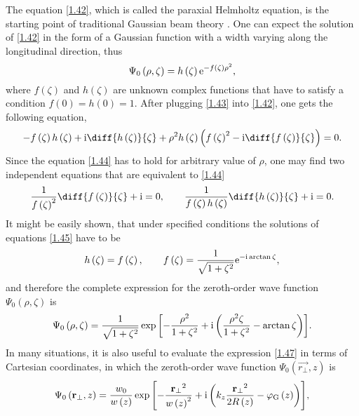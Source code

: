The equation \ref{1.42}, which is called the paraxial Helmholtz equation, is the starting point of traditional Gaussian beam theory \cite{Davis1979}. One can expect the solution of \ref{1.42} in the form of a Gaussian function with a width varying along the longitudinal direction, thus 
\begin{equation}
\label{1.43}
\Psi_0 \left(\rho, \zeta \right) = h\left(\zeta \right)\mathrm{e}^{-f\left(\zeta \right) \rho^2},
\end{equation}
where $ f\left(\zeta \right) $ and $ h\left(\zeta \right) $ are unknown complex functions that have to satisfy a condition $ f\left(0 \right) = h\left(0 \right) = 1 $. After plugging \ref{1.43} into \ref{1.42}, one gets the following equation,
\begin{equation}
\label{1.44}
-f\left(\zeta \right) h\left(\zeta \right) + \i \diff{h\left(\zeta \right)}{\zeta} + \rho^2 h\left(\zeta \right) \left(f\left(\zeta \right)^2 - \i \diff{f\left(\zeta \right)}{\zeta} \right) = 0.
\end{equation}
Since the equation \ref{1.44} has to hold for arbitrary value of $ \rho $, one may find two independent equations that are equivalent to \ref{1.44}
\begin{equation}
\label{1.45}
\frac{1}{f\left(\zeta \right)^2} \diff{f\left(\zeta \right)}{\zeta} + \i = 0, \qquad \frac{1}{f\left(\zeta \right) h\left(\zeta \right)} \diff{h\left(\zeta \right)}{\zeta} + \i = 0.
\end{equation}
It might be easily shown, that under specified conditions the solutions of equations \ref{1.45} have to be
\begin{equation}
\label{1.46}
h\left(\zeta \right) = f\left(\zeta \right), \qquad f\left(\zeta \right) = \frac{1}{\sqrt{1 + \zeta^2}} \mathrm{e}^{-\mathrm{i} \arctan{\zeta}},
\end{equation}
and therefore the complete expression for the zeroth-order wave function $ \Psi_0 \left(\rho, \zeta \right) $ is
\begin{equation}
\label{1.47}
\Psi_0 \left(\rho, \zeta \right) = \frac{1}{\sqrt{1 + \zeta^2}} \exp{\left[- \frac{\rho^2}{1 + \zeta^2} + \mathrm{i}\left(\frac{\rho^2 \zeta}{1 + \zeta^2} - \arctan{\zeta} \right) \right]}.
\end{equation}
In many situations, it is also useful to evaluate the expression \ref{1.47} in terms of Cartesian coordinates, in which the zeroth-order wave function $ \Psi_0 \left(\vec{r_\bot}, z \right) $ is
\begin{equation}
\label{1.48}
\Psi_0 \left(\mathbf{r_\bot}, z \right) = \frac{w_0}{w\left(z\right)} \exp{\left[- \frac{\mathbf{r_\bot}^2}{w\left(z \right)^2} + \mathrm{i}\left( k_z \frac{\mathbf{r_\bot}^2}{2 R\left(z \right)} - \varphi_\mathrm{G} \left( z\right) \right) \right]},
\end{equation}
